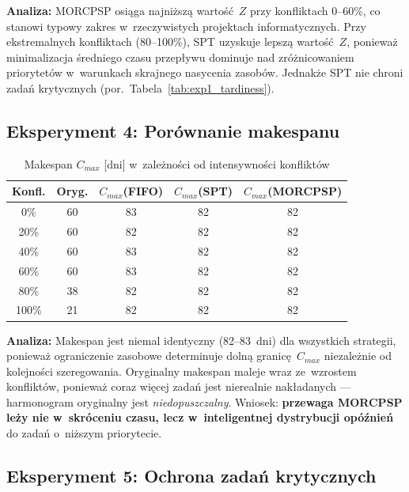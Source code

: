 \textbf{Analiza:} MORCPSP osiąga najniższą wartość~$Z$ przy konfliktach 0--60\%, co stanowi typowy zakres w~rzeczywistych projektach informatycznych. Przy ekstremalnych konfliktach (80--100\%), SPT uzyskuje lepszą wartość~$Z$, ponieważ minimalizacja średniego czasu przepływu dominuje nad zróżnicowaniem priorytetów w~warunkach skrajnego nasycenia zasobów. Jednakże SPT nie chroni zadań krytycznych (por.~Tabela~\ref{tab:exp1_tardiness}).

\subsection{Eksperyment 4: Porównanie makespanu}

\begin{table}[H]
\centering
\caption{Makespan $C_{max}$ [dni] w~zależności od intensywności konfliktów}
\label{tab:exp4_makespan}
\begin{tabular}{|c|c|c|c|c|}
\hline
\textbf{Konfl.} & \textbf{Oryg.} & $C_{max}$\textbf{(FIFO)} & $C_{max}$\textbf{(SPT)} & $C_{max}$\textbf{(MORCPSP)} \\ \hline
0\% & 60 & 83 & 82 & 82 \\ \hline
20\% & 60 & 82 & 82 & 82 \\ \hline
40\% & 60 & 83 & 82 & 82 \\ \hline
60\% & 60 & 83 & 82 & 82 \\ \hline
80\% & 38 & 82 & 82 & 82 \\ \hline
100\% & 21 & 82 & 82 & 82 \\ \hline
\end{tabular}
\end{table}

\textbf{Analiza:} Makespan jest niemal identyczny (82--83~dni) dla wszystkich strategii, ponieważ ograniczenie zasobowe determinuje dolną granicę~$C_{max}$ niezależnie od kolejności szeregowania. Oryginalny makespan maleje wraz ze~wzrostem konfliktów, ponieważ coraz więcej zadań jest nierealnie nakładanych --- harmonogram oryginalny jest \textit{niedopuszczalny}. Wniosek: \textbf{przewaga MORCPSP leży nie w~skróceniu czasu, lecz w~inteligentnej dystrybucji opóźnień} do zadań o~niższym priorytecie.

\subsection{Eksperyment 5: Ochrona zadań krytycznych}


